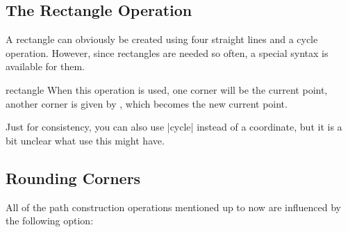 \subsection{The Rectangle Operation}

A rectangle can obviously be created using four straight lines and a cycle
operation. However, since rectangles are needed so often, a special syntax is
available for them.

\begin{pathoperation}{rectangle}{}
    When this operation is used, one corner will be the current point, another
    corner is given by , which becomes the new current point.
\begin{codeexample}[]
\end{codeexample}

    Just for consistency, you can also use |cycle| instead of a coordinate, but
    it is a bit unclear what use this might have.
\end{pathoperation}


\subsection{Rounding Corners}

All of the path construction operations mentioned up to now are influenced by
the following option:

